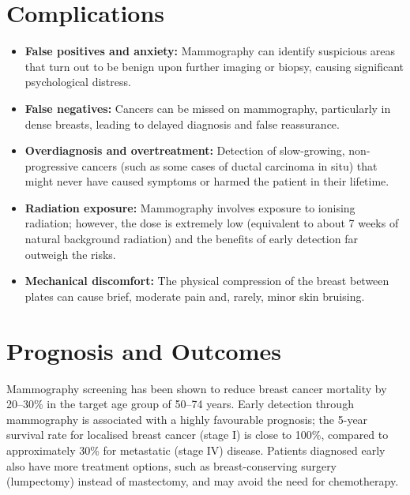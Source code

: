 \section*{Complications}
\begin{itemize}
    \item \textbf{False positives and anxiety:} Mammography can identify suspicious areas that turn out to be benign upon further imaging or biopsy, causing significant psychological distress.
    \item \textbf{False negatives:} Cancers can be missed on mammography, particularly in dense breasts, leading to delayed diagnosis and false reassurance.
    \item \textbf{Overdiagnosis and overtreatment:} Detection of slow-growing, non-progressive cancers (such as some cases of ductal carcinoma in situ) that might never have caused symptoms or harmed the patient in their lifetime.
    \item \textbf{Radiation exposure:} Mammography involves exposure to ionising radiation; however, the dose is extremely low (equivalent to about 7 weeks of natural background radiation) and the benefits of early detection far outweigh the risks.
    \item \textbf{Mechanical discomfort:} The physical compression of the breast between plates can cause brief, moderate pain and, rarely, minor skin bruising.
\end{itemize}

\section*{Prognosis and Outcomes}
Mammography screening has been shown to reduce breast cancer mortality by 20--30\% in the target age group of 50--74 years. Early detection through mammography is associated with a highly favourable prognosis; the 5-year survival rate for localised breast cancer (stage I) is close to 100\%, compared to approximately 30\% for metastatic (stage IV) disease. Patients diagnosed early also have more treatment options, such as breast-conserving surgery (lumpectomy) instead of mastectomy, and may avoid the need for chemotherapy.

